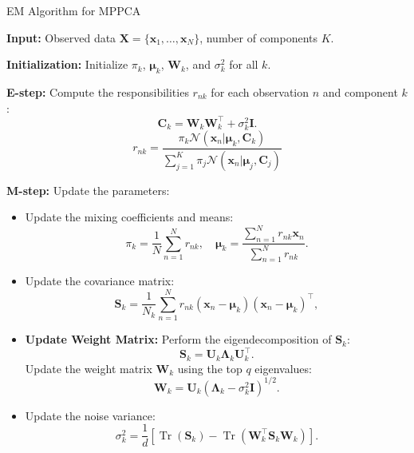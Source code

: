 \documentclass{article}
\begin{document}
\begin{algorithm}[H]
\caption{EM Algorithm for MPPCA}
\label{alg:MPPCA}
    \begin{algorithmic}  %
    \STATE \textbf{Input:} Observed data \(\mathbf{X} = \{\mathbf{x}_1, \dots, \mathbf{x}_N\}\), number of components \(K\).

    \STATE \textbf{Initialization:} Initialize \(\pi_k\), \(\boldsymbol{\mu}_k\), \(\mathbf{W}_k\), and \(\sigma_k^2\) for all \(k\).

    \REPEAT
        \STATE \textbf{E-step:} Compute the responsibilities \(r_{nk}\) for each observation \(n\) and component \(k\):
        \[
            \mathbf{C}_k = \mathbf{W}_k \mathbf{W}_k^\top + \sigma_k^2 \mathbf{I}.
           \]
        \[
        r_{nk} = \frac{\pi_k \mathcal{N}(\mathbf{x}_n | \boldsymbol{\mu}_k, \mathbf{C}_k)}{\sum_{j=1}^K \pi_j \mathcal{N}(\mathbf{x}_n | \boldsymbol{\mu}_j, \mathbf{C}_j)}
        \]

    
        \STATE \textbf{M-step:} Update the parameters:
        \begin{itemize}
            \item Update the mixing coefficients and means:
            \[
            \pi_k = \frac{1}{N} \sum_{n=1}^N r_{nk}, \quad \boldsymbol{\mu}_k = \frac{\sum_{n=1}^N r_{nk} \mathbf{x}_n}{\sum_{n=1}^N r_{nk}}.
            \]
            \item Update the covariance matrix:
            \[
            \mathbf{S}_k = \frac{1}{N_k} \sum_{n=1}^N r_{nk} (\mathbf{x}_n - \boldsymbol{\mu}_k)(\mathbf{x}_n - \boldsymbol{\mu}_k)^\top, 
            \]
            \item \textbf{Update Weight Matrix:}
            Perform the eigendecomposition of \(\mathbf{S}_k\):
            \[
            \mathbf{S}_k = \mathbf{U}_k \mathbf{\Lambda}_k \mathbf{U}_k^\top.
            \]
            Update the weight matrix \(\mathbf{W}_k\) using the top \(q\) eigenvalues:
            \[
            \mathbf{W}_k = \mathbf{U}_k \left( \mathbf{\Lambda}_k - \sigma_k^2 \mathbf{I} \right)^{1/2}.
            \]
            \item Update the noise variance:
            \[
            \sigma_k^2 = \frac{1}{d} \left[ \operatorname{Tr}(\mathbf{S}_k) - \operatorname{Tr}(\mathbf{W}_k^\top \mathbf{S}_k \mathbf{W}_k) \right].
            \]
        \end{itemize}
    
    \end{algorithmic}
    \end{algorithm}
\end{document}
